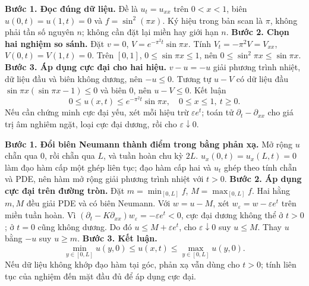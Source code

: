 \textbf{Bước 1. Đọc đúng dữ liệu.} Đề là $u_t=u_{xx}$ trên $0<x<1$, biên $u(0,t)=u(1,t)=0$ và $f=\sin^2(\pi x)$. Ký hiệu trong bản scan là $\pi$, không phải tần số nguyên $n$; không cần đặt lại miền hay giới hạn $n$.
\textbf{Bước 2. Chọn hai nghiệm so sánh.} Đặt $v=0$, $V=e^{-\pi^2t}\sin\pi x$. Tính $V_t=-\pi^2V=V_{xx}$, $V(0,t)=V(1,t)=0$. Trên $[0,1]$, $0\le\sin\pi x\le1$, nên $0\le\sin^2\pi x\le\sin\pi x$.
\textbf{Bước 3. Áp dụng cực đại cho hai hiệu.} $v-u=-u$ giải phương trình nhiệt, dữ liệu đầu và biên không dương, nên $-u\le0$. Tương tự $u-V$ có dữ liệu đầu $\sin\pi x(\sin\pi x-1)\le0$ và biên $0$, nên $u-V\le0$. Kết luận
\[0\le u(x,t)\le e^{-\pi^2t}\sin\pi x,\quad 0\le x\le1,\ t\ge0.\]
Nếu cần chứng minh cực đại yếu, xét mỗi hiệu trừ $\varepsilon e^t$; toán tử $\partial_t-\partial_{xx}$ cho giá trị âm nghiêm ngặt, loại cực đại dương, rồi cho $\varepsilon\downarrow0$.

\textbf{Bước 1. Đổi biên Neumann thành điểm trong bằng phản xạ.} Mở rộng $u$ chẵn qua $0$, rồi chẵn qua $L$, và tuần hoàn chu kỳ $2L$. $u_x(0,t)=u_x(L,t)=0$ làm đạo hàm cấp một ghép liên tục; đạo hàm cấp hai và $u_t$ ghép theo tính chẵn và PDE, nên hàm mở rộng giải phương trình nhiệt với $t>0$.
\textbf{Bước 2. Áp dụng cực đại trên đường tròn.} Đặt $m=\min_{[0,L]}f$, $M=\max_{[0,L]}f$. Hai hằng $m,M$ đều giải PDE và có biên Neumann. Với $w=u-M$, xét $w_\varepsilon=w-\varepsilon e^t$ trên miền tuần hoàn. Vì $(\partial_t-K\partial_{xx})w_\varepsilon=-\varepsilon e^t<0$, cực đại dương không thể ở $t>0$; ở $t=0$ cũng không dương. Do đó $u\le M+\varepsilon e^t$, cho $\varepsilon\downarrow0$ suy $u\le M$. Thay $u$ bằng $-u$ suy $u\ge m$.
\textbf{Bước 3. Kết luận.}
\[\min_{y\in[0,L]}u(y,0)\le u(x,t)\le\max_{y\in[0,L]}u(y,0).\]
Nếu dữ liệu không khớp đạo hàm tại góc, phản xạ vẫn dùng cho $t>0$; tính liên tục của nghiệm đến mặt đầu đủ để áp dụng cực đại.

